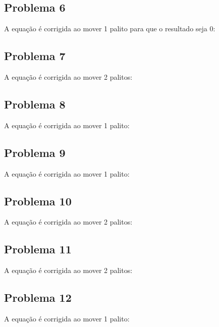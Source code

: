 \documentclass[a4paper,11pt]{article}
\begin{document}
  \digitOne \plus \digitSeven \equal \digitZero

  \subsection*{Problema 6}
  A equação é corrigida ao mover 1 palito para que o resultado seja 0:

  \digitNine \minus \digitFive \minus \digitOne \equal \digitZero

  \subsection*{Problema 7}
  A equação é corrigida ao mover 2 palitos:

  \digitOne \minus \digitOne \equal \digitNine

  \subsection*{Problema 8}
  A equação é corrigida ao mover 1 palito:

  \digitNine \plus \digitThree \equal \digitNine

  \subsection*{Problema 9}
  A equação é corrigida ao mover 1 palito:

  \digitEight \minus \digitEight \equal \digitNine

  \subsection*{Problema 10}
  A equação é corrigida ao mover 2 palitos:

  \digitFour \digitOne \minus \digitTwo \equal \digitFour
  
  \subsection*{Problema 11}
  A equação é corrigida ao mover 2 palitos:

  \digitZero \plus \digitZero \equal \digitOne \digitTwo
  
  \subsection*{Problema 12}
  A equação é corrigida ao mover 1 palito:

  \digitEight \minus \digitFour \equal \digitZero
  
\end{document}
